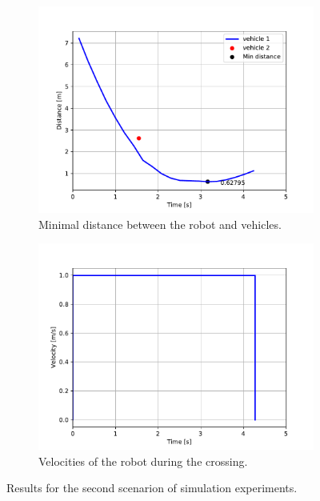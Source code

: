             \begin{figure}[ht]
                \centering
                \begin{subfigure}{0.49\linewidth}
                    \centering
                    \includegraphics[trim={24 8 40 41}, clip, width=\linewidth]{images/simulations/scene2_3_dist.pdf}
                    \caption{Minimal distance between the robot and vehicles.}
                \end{subfigure}
                \begin{subfigure}{0.49\linewidth}
                    \centering
                    \includegraphics[trim={21 8 40 41}, clip, width=\linewidth]{images/simulations/scene2_3_vel.pdf}
                    \caption{Velocities of the robot during the crossing.}
                \end{subfigure}
                \caption{Results for the second scenarion of simulation experiments.}
                \label{fig:scene2_3_graphs}
            \end{figure}
